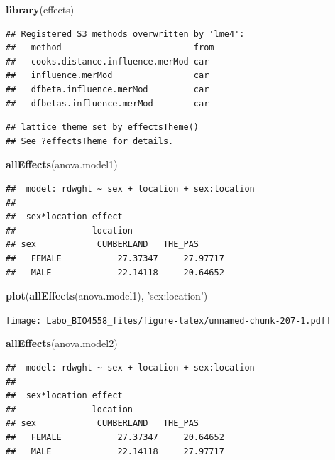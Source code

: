 \documentclass[12pt,]{book}
\newenvironment{Shaded}{\begin{snugshade}}{\end{snugshade}}
\newcommand{\KeywordTok}[1]{\textcolor[rgb]{0.27,0.27,0.27}{\textbf{#1}}}
\newcommand{\NormalTok}[1]{#1}
\newcommand{\StringTok}[1]{\textcolor[rgb]{0.5,0.5,0.5}{#1}}
\begin{document}
\begin{Shaded}
\begin{Highlighting}[]
\KeywordTok{library}\NormalTok{(effects)}
\end{Highlighting}
\end{Shaded}

\begin{verbatim}
## Registered S3 methods overwritten by 'lme4':
##   method                          from
##   cooks.distance.influence.merMod car 
##   influence.merMod                car 
##   dfbeta.influence.merMod         car 
##   dfbetas.influence.merMod        car
\end{verbatim}

\begin{verbatim}
## lattice theme set by effectsTheme()
## See ?effectsTheme for details.
\end{verbatim}

\begin{Shaded}
\begin{Highlighting}[]
\KeywordTok{allEffects}\NormalTok{(anova.model1)}
\end{Highlighting}
\end{Shaded}

\begin{verbatim}
##  model: rdwght ~ sex + location + sex:location
## 
##  sex*location effect
##               location
## sex            CUMBERLAND   THE_PAS     
##   FEMALE           27.37347     27.97717
##   MALE             22.14118     20.64652
\end{verbatim}

\begin{Shaded}
\begin{Highlighting}[]
\KeywordTok{plot}\NormalTok{(}\KeywordTok{allEffects}\NormalTok{(anova.model1), }\StringTok{'sex:location'}\NormalTok{)}
\end{Highlighting}
\end{Shaded}

\texttt{[image: Labo\_BIO4558\_files/figure-latex/unnamed-chunk-207-1.pdf]}

\begin{Shaded}
\begin{Highlighting}[]
\KeywordTok{allEffects}\NormalTok{(anova.model2)}
\end{Highlighting}
\end{Shaded}

\begin{verbatim}
##  model: rdwght ~ sex + location + sex:location
## 
##  sex*location effect
##               location
## sex            CUMBERLAND   THE_PAS     
##   FEMALE           27.37347     20.64652
##   MALE             22.14118     27.97717
\end{verbatim}
\end{document}
